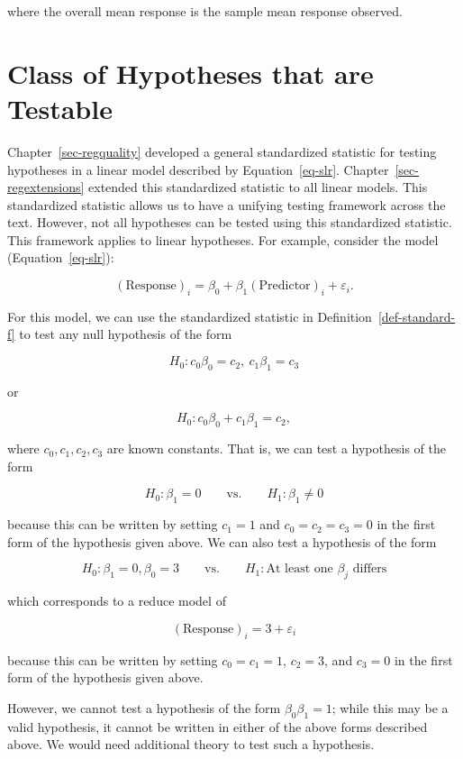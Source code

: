 \documentclass[
  letterpaper,
  DIV=11,
  numbers=noendperiod]{scrreprt}
\theoremstyle{definition}
\theoremstyle{definition}
\theoremstyle{plain}
\theoremstyle{remark}
\begin{document}
where the overall mean response is the sample mean response observed.

\section{Class of Hypotheses that are
Testable}\label{class-of-hypotheses-that-are-testable}

Chapter~\ref{sec-regquality} developed a general standardized statistic
for testing hypotheses in a linear model described by
Equation~\ref{eq-slr}. Chapter~\ref{sec-regextensions} extended this
standardized statistic to all linear models. This standardized statistic
allows us to have a unifying testing framework across the text. However,
not all hypotheses can be tested using this standardized statistic. This
framework applies to linear hypotheses. For example, consider the model
(Equation~\ref{eq-slr}):

\[(\text{Response})_i = \beta_0 + \beta_1 (\text{Predictor})_i + \varepsilon_i.\]

For this model, we can use the standardized statistic in
Definition~\ref{def-standard-f} to test any null hypothesis of the form

\[H_0: c_0\beta_0 = c_2, \ c_1\beta_1 = c_3\]

or

\[H_0: c_0\beta_0 + c_1\beta_1 = c_2,\]

where \(c_0, c_1, c_2, c_3\) are known constants. That is, we can test a
hypothesis of the form

\[H_0: \beta_1 = 0 \qquad \text{vs.} \qquad H_1: \beta_1 \neq 0\]

because this can be written by setting \(c_1 = 1\) and
\(c_0 = c_2 = c_3 = 0\) in the first form of the hypothesis given above.
We can also test a hypothesis of the form

\[H_0: \beta_1 = 0, \beta_0 = 3 \qquad \text{vs.} \qquad H_1: \text{At least one } \beta_j \text{ differs}\]

which corresponds to a reduce model of

\[(\text{Response})_i = 3 + \varepsilon_i\]

because this can be written by setting \(c_0 = c_1 = 1\), \(c_2 = 3\),
and \(c_3 = 0\) in the first form of the hypothesis given above.

However, we cannot test a hypothesis of the form \(\beta_0\beta_1 = 1\);
while this may be a valid hypothesis, it cannot be written in either of
the above forms described above. We would need additional theory to test
such a hypothesis.
\end{document}
